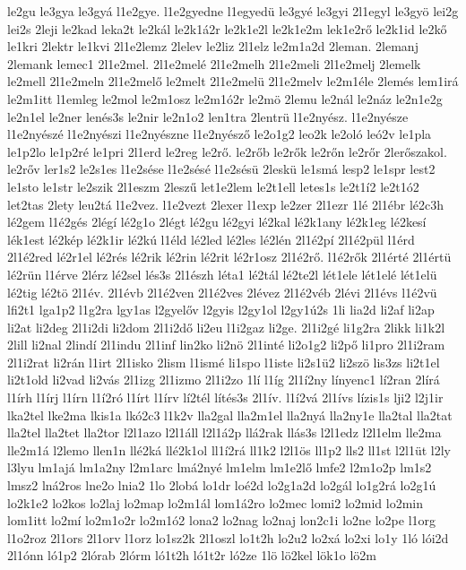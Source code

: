{le2gu
le3gya
le3gyá
l1e2gye.
l1e2gyedne
l1egyedü
le3gyé
le3gyi
2l1egyl
le3gyö
lei2g
lei2s
2leji
le2kad
leka2t
le2kál
le2k1á2r
le2k1e2l
le2k1e2m
lek1e2rő
le2k1id
le2kő
le1kri
2lektr
le1kvi
2l1e2lemz
2lelev
le2liz
2l1elz
le2m1a2d
2leman.
2lemanj
2lemank
lemec1
2l1e2mel.
2l1e2melé
2l1e2melh
2l1e2meli
2l1e2melj
2lemelk
le2mell
2l1e2meln
2l1e2melő
le2melt
2l1e2melü
2l1e2melv
le2m1éle
2lemés
lem1irá
le2m1itt
l1emleg
le2mol
le2m1osz
le2m1ó2r
le2mö
2lemu
le2nál
le2náz
le2n1e2g
le2n1el
le2ner
lenés3s
le2nir
le2n1o2
len1tra
2lentrü
l1e2nyész.
l1e2nyésze
l1e2nyészé
l1e2nyészi
l1e2nyészne
l1e2nyésző
le2o1g2
leo2k
le2oló
leó2v
le1pla
le1p2lo
le1p2ré
le1pri
2l1erd
le2reg
le2rő.
le2rőb
le2rők
le2rőn
le2rőr
2lerőszakol.
le2rőv
ler1s2
le2s1es
l1e2sése
l1e2sésé
l1e2sésü
2leskü
le1smá
lesp2
le1spr
lest2
le1sto
le1str
le2szik
2l1eszm
2leszű
let1e2lem
le2t1ell
letes1s
le2t1í2
le2t1ó2
let2tas
2lety
leu2tá
l1e2vez.
l1e2vezt
2lexer
l1exp
le2zer
2l1ezr
1lé
2l1ébr
lé2c3h
lé2gem
l1é2gés
2légí
lé2g1o
2légt
lé2gu
lé2gyi
lé2kal
lé2k1any
lé2k1eg
lé2kesí
lék1est
lé2kép
lé2k1ir
lé2kú
l1éld
lé2led
lé2les
lé2lén
2l1é2pí
2l1é2pül
l1érd
2l1é2red
lé2r1el
lé2rés
lé2rik
lé2rin
lé2rit
lé2r1osz
2l1é2rő.
l1é2rők
2l1érté
2l1értü
lé2rün
l1érve
2lérz
lé2sel
lés3s
2l1észh
léta1
lé2tál
lé2te2l
lét1ele
lét1elé
lét1elü
lé2tig
lé2tö
2l1év.
2l1évb
2l1é2ven
2l1é2ves
2lévez
2l1é2véb
2lévi
2l1évs
l1é2vü
lfi2t1
lga1p2
l1g2ra
lgy1as
l2gyelőv
l2gyis
l2gy1ol
l2gy1ú2s
1li
lia2d
li2af
li2ap
li2at
li2deg
2l1i2di
li2dom
2l1i2dő
li2eu
l1i2gaz
li2ge.
2l1i2gé
li1g2ra
2likk
li1k2l
2lill
li2nal
2lindí
2l1indu
2l1inf
lin2ko
li2nö
2l1inté
li2o1g2
li2pő
li1pro
2l1i2ram
2l1i2rat
li2rán
l1irt
2l1isko
2lism
l1ismé
li1spo
l1iste
li2s1ü2
li2szö
lis3zs
li2t1el
li2t1old
li2vad
li2vás
2l1izg
2l1izmo
2l1i2zo
1lí
l1íg
2l1í2ny
línyenc1
lí2ran
2lírá
l1írh
l1írj
l1írn
l1í2ró
l1írt
l1írv
lí2tél
lítés3s
2l1ív.
l1í2vá
2l1ívs
lízis1s
lji2
l2j1ir
lka2tel
lke2ma
lkis1a
lkó2c3
l1k2v
lla2gal
lla2m1el
lla2nyá
lla2ny1e
lla2tal
lla2tat
lla2tel
lla2tet
lla2tor
l2l1azo
l2l1áll
l2l1á2p
llá2rak
llás3s
l2l1edz
l2l1elm
lle2ma
lle2m1á
l2lemo
llen1n
llé2ká
llé2k1ol
ll1í2rá
ll1k2
l2l1ös
ll1p2
lls2
ll1st
l2l1üt
l2ly
l3lyu
lm1ajá
lm1a2ny
l2m1arc
lmá2nyé
lm1elm
lm1e2lő
lmfe2
l2m1o2p
lm1s2
lmsz2
lná2ros
lne2o
lnia2
1lo
2lobá
lo1dr
loé2d
lo2g1a2d
lo2gál
lo1g2rá
lo2g1ú
lo2k1e2
lo2kos
lo2laj
lo2map
lo2m1ál
lom1á2ro
lo2mec
lomi2
lo2mid
lo2min
lom1itt
lo2mí
lo2m1o2r
lo2m1ó2
lona2
lo2nag
lo2naj
lon2c1i
lo2ne
lo2pe
l1org
l1o2roz
2l1ors
2l1orv
l1orz
lo1sz2k
2l1oszl
lo1t2h
lo2u2
lo2xá
lo2xi
lo1y
1ló
lói2d
2l1ónn
ló1p2
2lórab
2lórm
ló1t2h
ló1t2r
ló2ze
1lö
lö2kel
lök1o
lö2m
}

